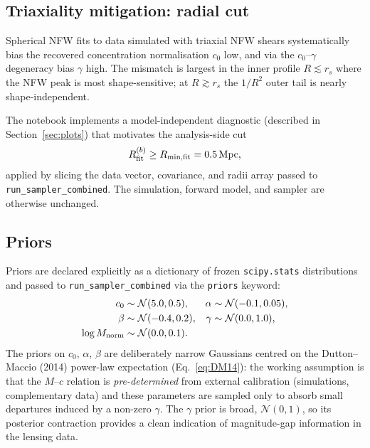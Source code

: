 \documentclass[11pt,a4paper]{article}
\newcommand{\Rmin}{R_{\rm min,fit}}
\begin{document}
\subsection{Triaxiality mitigation: radial cut}
\label{sec:radial_cut}

Spherical NFW fits to data simulated with triaxial NFW shears systematically
bias the recovered concentration normalisation $c_0$ low, and via the
$c_0$--$\gamma$ degeneracy bias $\gamma$ high.  The mismatch is largest in
the inner profile $R\lesssim r_s$ where the NFW peak is most shape-sensitive;
at $R \gtrsim r_s$ the $1/R^2$ outer tail is nearly shape-independent.

The notebook implements a model-independent diagnostic (described in
Section~\ref{sec:plots}) that motivates the analysis-side cut
\begin{equation}
  R_{\rm fit}^{(b)} \ge \Rmin = 0.5\,\mathrm{Mpc},
\end{equation}
applied by slicing the data vector, covariance, and radii array passed to
\texttt{run\_sampler\_combined}.  The simulation, forward model, and sampler
are otherwise unchanged.

\subsection{Priors}
\label{sec:priors}

Priors are declared explicitly as a dictionary of frozen
\texttt{scipy.stats} distributions and passed to
\texttt{run\_sampler\_combined} via the \texttt{priors} keyword:
\begin{equation}
  \begin{aligned}
    c_0          &\sim \mathcal{N}( 5.0, 0.5),  & \alpha       &\sim \mathcal{N}(-0.1, 0.05),\\
    \beta        &\sim \mathcal{N}(-0.4, 0.2),  & \gamma       &\sim \mathcal{N}( 0.0, 1.0),\\
    \log M_{\rm norm} &\sim \mathcal{N}( 0.0, 0.1). & &
  \end{aligned}
  \label{eq:priors}
\end{equation}
The priors on $c_0$, $\alpha$, $\beta$ are deliberately narrow Gaussians
centred on the Dutton--Maccio (2014) power-law expectation
(Eq.~\ref{eq:DM14}): the working assumption is that the $M$--$c$ relation is
\emph{pre-determined} from external calibration (simulations, complementary
data) and these parameters are sampled only to absorb small departures induced
by a non-zero $\gamma$.  The $\gamma$ prior is broad, $\mathcal{N}(0, 1)$, so
its posterior contraction provides a clean indication of magnitude-gap
information in the lensing data.
\end{document}
